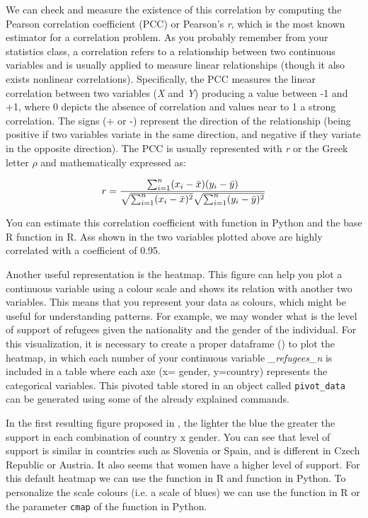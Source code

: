 We can check and measure the existence of this correlation by computing the Pearson correlation coefficient (PCC) or Pearson's \emph{r}, which is the most known estimator for a correlation problem. As you probably remember from your statistics class, a correlation refers to a relationship between two continuous variables and is usually applied to measure linear relationships (though it also exists nonlinear correlations). Specifically, the PCC measures the linear correlation between two variables (\emph{X} and \emph{Y}) producing a value between -1 and +1, where 0 depicts the absence of correlation and values near to 1 a strong correlation. The signs (+ or -) represent the direction of the relationship (being positive if two variables variate in the same direction, and negative if they variate in the opposite direction). The PCC is usually represented with \emph{r} or the Greek letter $\rho$ and mathematically expressed as:

$$
  r =
  \frac{ \sum_{i=1}^{n}(x_i-\bar{x})(y_i-\bar{y}) }{%
        \sqrt{\sum_{i=1}^{n}(x_i-\bar{x})^2}\sqrt{\sum_{i=1}^{n}(y_i-\bar{y})^2}}
$$

You can estimate this correlation coefficient with  function  in Python and the base R function  in R. Ass shown in  the two variables plotted above are highly correlated with a coefficient of 0.95.


Another useful representation is the heatmap. This figure can help you plot a continuous variable using a colour scale and shows its relation with another two variables.  This means that you represent your data as colours, which might be useful for understanding patterns. For example, we may wonder what is the level of support of refugees given the nationality and the gender of the individual. For this visualization, it is necessary to create a proper dataframe () to plot the heatmap, in which each number of your continuous variable \emph{\_refugees\_n} is included in a table where each axe (x= gender, y=country) represents the categorical variables. This pivoted table stored in an object called \texttt{pivot\_data} can be generated using some of the already explained commands.


In the first resulting figure proposed in , the lighter the blue the greater the support in each combination of country x gender. You can see that level of support is similar in countries such as Slovenia or Spain, and is different in Czech Republic or Austria. It also seems that women have a higher level of support. For this default heatmap we can use the  function  in R and  function  in Python.  To personalize the scale colours (i.e. a scale of blues) we can use the  function  in R or the parameter \texttt{cmap} of the  function  in Python. 

